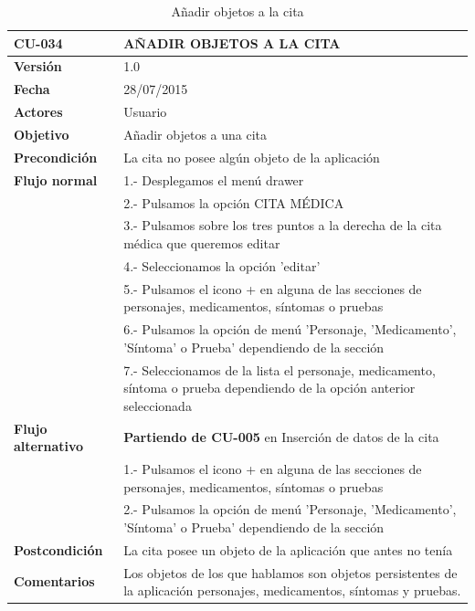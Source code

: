 \documentclass[../pfc.tex]{subfiles}
\begin{document}
	\begin{table}[H]
		\centering
		\begin{tabular}[t]{|p{3cm}|p{9.5cm}|}
			\hline \textbf{CU-034} & \textbf{AÑADIR OBJETOS A LA CITA}\\*
			\hline\hline \textbf{Versión} & 1.0 \\*
			\hline\hline \textbf{Fecha} & 28/07/2015 \\*
			\hline\textbf{Actores} 	& Usuario\\*
			\hline \textbf{Objetivo} & Añadir objetos a una cita\\* 			
			\hline \textbf{Precondición} & La cita no posee algún objeto de la aplicación\\* 
			\hline \textbf{Flujo normal} & 1.- Desplegamos el menú drawer \\* 
			& 2.- Pulsamos la opción CITA MÉDICA\\*	
			& 3.- Pulsamos sobre los tres puntos a la derecha de la cita médica que queremos editar\\*	
			& 4.- Seleccionamos la opción 'editar'\\*	
			& 5.- Pulsamos el icono + en alguna de las secciones de personajes, medicamentos, síntomas o pruebas\\*
			& 6.- Pulsamos la opción de menú 'Personaje, 'Medicamento', 'Síntoma' o Prueba' dependiendo de la sección\\*
			& 7.- Seleccionamos de la lista el personaje, medicamento, síntoma o prueba dependiendo de la opción anterior seleccionada\\*
			\hline \textbf{Flujo alternativo} & \textbf{Partiendo de CU-005} en Inserción de datos de la cita\\*  
			& 1.- Pulsamos el icono + en alguna de las secciones de personajes, medicamentos, síntomas o pruebas\\*
			& 2.- Pulsamos la opción de menú 'Personaje, 'Medicamento', 'Síntoma' o Prueba' dependiendo de la sección\\*
			\hline \textbf{Postcondición} & La cita posee un objeto de la aplicación que antes no tenía\\* 
			\hline \textbf{Comentarios}   & Los objetos de los que hablamos son objetos persistentes de la aplicación personajes, medicamentos, síntomas y pruebas.\\*
			\hline
		\end{tabular}
		\caption{Añadir objetos a la cita}
		\label{tabla:caso034}
	\end{table}
\end{document}
